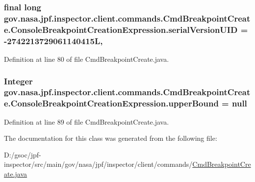 \subsubsection[{\texorpdfstring{serial\+Version\+U\+ID}{serialVersionUID}}]{\setlength{\rightskip}{0pt plus 5cm}final long gov.\+nasa.\+jpf.\+inspector.\+client.\+commands.\+Cmd\+Breakpoint\+Create.\+Console\+Breakpoint\+Creation\+Expression.\+serial\+Version\+U\+ID = -\/2742213729061140415L\hspace{0.3cm}{\ttfamily [static]}, {\ttfamily [private]}}\hypertarget{classgov_1_1nasa_1_1jpf_1_1inspector_1_1client_1_1commands_1_1_cmd_breakpoint_create_1_1_console_breakpoint_creation_expression_aa72aefa26c2de13e77a2b34d984e4e5f}{}\label{classgov_1_1nasa_1_1jpf_1_1inspector_1_1client_1_1commands_1_1_cmd_breakpoint_create_1_1_console_breakpoint_creation_expression_aa72aefa26c2de13e77a2b34d984e4e5f}


Definition at line 80 of file Cmd\+Breakpoint\+Create.\+java.

\subsubsection[{\texorpdfstring{upper\+Bound}{upperBound}}]{\setlength{\rightskip}{0pt plus 5cm}Integer gov.\+nasa.\+jpf.\+inspector.\+client.\+commands.\+Cmd\+Breakpoint\+Create.\+Console\+Breakpoint\+Creation\+Expression.\+upper\+Bound = null\hspace{0.3cm}{\ttfamily [private]}}\hypertarget{classgov_1_1nasa_1_1jpf_1_1inspector_1_1client_1_1commands_1_1_cmd_breakpoint_create_1_1_console_breakpoint_creation_expression_afc19a93fec068e4fc73750253deea264}{}\label{classgov_1_1nasa_1_1jpf_1_1inspector_1_1client_1_1commands_1_1_cmd_breakpoint_create_1_1_console_breakpoint_creation_expression_afc19a93fec068e4fc73750253deea264}


Definition at line 89 of file Cmd\+Breakpoint\+Create.\+java.



The documentation for this class was generated from the following file\+:\begin{DoxyCompactItemize}
\item 
D\+:/gsoc/jpf-\/inspector/src/main/gov/nasa/jpf/inspector/client/commands/\hyperlink{_cmd_breakpoint_create_8java}{Cmd\+Breakpoint\+Create.\+java}\end{DoxyCompactItemize}
